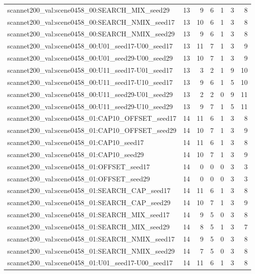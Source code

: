 \begin{table}[t]
\begin{tabular}{lrrrrrr}
scannet200\_val:scene0458\_00:SEARCH\_MIX\_seed29 & 13 & 9 & 6 & 1 & 3 & 8 \\
scannet200\_val:scene0458\_00:SEARCH\_NMIX\_seed17 & 13 & 10 & 6 & 1 & 3 & 8 \\
scannet200\_val:scene0458\_00:SEARCH\_NMIX\_seed29 & 13 & 9 & 6 & 1 & 3 & 8 \\
scannet200\_val:scene0458\_00:U01\_seed17-U00\_seed17 & 13 & 11 & 7 & 1 & 3 & 9 \\
scannet200\_val:scene0458\_00:U01\_seed29-U00\_seed29 & 13 & 10 & 7 & 1 & 3 & 9 \\
scannet200\_val:scene0458\_00:U11\_seed17-U01\_seed17 & 13 & 3 & 2 & 1 & 9 & 10 \\
scannet200\_val:scene0458\_00:U11\_seed17-U10\_seed17 & 13 & 9 & 6 & 1 & 5 & 10 \\
scannet200\_val:scene0458\_00:U11\_seed29-U01\_seed29 & 13 & 2 & 2 & 0 & 9 & 11 \\
scannet200\_val:scene0458\_00:U11\_seed29-U10\_seed29 & 13 & 9 & 7 & 1 & 5 & 11 \\
scannet200\_val:scene0458\_01:CAP10\_OFFSET\_seed17 & 14 & 11 & 6 & 1 & 3 & 8 \\
scannet200\_val:scene0458\_01:CAP10\_OFFSET\_seed29 & 14 & 10 & 7 & 1 & 3 & 9 \\
scannet200\_val:scene0458\_01:CAP10\_seed17 & 14 & 11 & 6 & 1 & 3 & 8 \\
scannet200\_val:scene0458\_01:CAP10\_seed29 & 14 & 10 & 7 & 1 & 3 & 9 \\
scannet200\_val:scene0458\_01:OFFSET\_seed17 & 14 & 0 & 0 & 0 & 3 & 3 \\
scannet200\_val:scene0458\_01:OFFSET\_seed29 & 14 & 0 & 0 & 0 & 3 & 3 \\
scannet200\_val:scene0458\_01:SEARCH\_CAP\_seed17 & 14 & 11 & 6 & 1 & 3 & 8 \\
scannet200\_val:scene0458\_01:SEARCH\_CAP\_seed29 & 14 & 10 & 7 & 1 & 3 & 9 \\
scannet200\_val:scene0458\_01:SEARCH\_MIX\_seed17 & 14 & 9 & 5 & 0 & 3 & 8 \\
scannet200\_val:scene0458\_01:SEARCH\_MIX\_seed29 & 14 & 8 & 5 & 1 & 3 & 7 \\
scannet200\_val:scene0458\_01:SEARCH\_NMIX\_seed17 & 14 & 9 & 5 & 0 & 3 & 8 \\
scannet200\_val:scene0458\_01:SEARCH\_NMIX\_seed29 & 14 & 7 & 5 & 0 & 3 & 8 \\
scannet200\_val:scene0458\_01:U01\_seed17-U00\_seed17 & 14 & 11 & 6 & 1 & 3 & 8 \\

\end{tabular}
\end{table}
